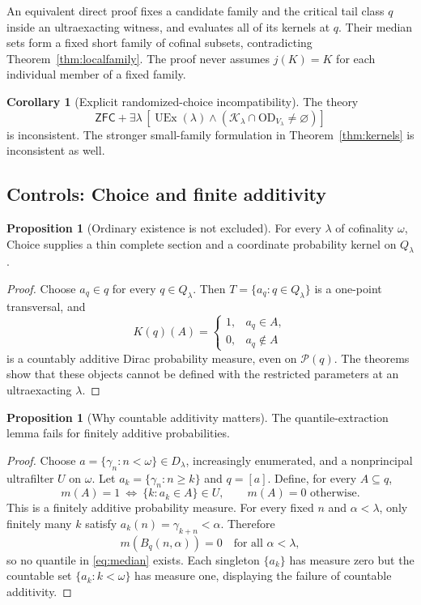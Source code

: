 \documentclass[11pt,letterpaper]{article}
\theoremstyle{definition}
\newtheorem{proposition}[definition]{Proposition}
\newtheorem{corollary}[definition]{Corollary}
\numberwithin{equation}{section}
\newcommand{\ZFC}{\mathsf{ZFC}}
\newcommand{\OD}{\mathrm{OD}}
\newcommand{\UEx}{\operatorname{UEx}}
\newcommand{\Pow}{\mathcal P}
\newcommand{\D}{D_\lambda}
\newcommand{\Q}{Q_\lambda}
\newcommand{\Ker}{\mathcal K_\lambda}
\begin{document}
An equivalent direct proof fixes a candidate family and the critical tail class $q$ inside an ultraexacting witness, and evaluates all of its kernels at $q$. Their median sets form a fixed short family of cofinal subsets, contradicting Theorem~\ref{thm:localfamily}. The proof never assumes $j(K)=K$ for each individual member of a fixed family.

\begin{corollary}[Explicit randomized-choice incompatibility]\label{cor:kernelcons}
The theory
\[
 \ZFC+\exists\lambda\,[\UEx(\lambda)\wedge
          (\Ker\cap\OD_{V_\lambda}\ne\varnothing)]
\]
is inconsistent. The stronger small-family formulation in Theorem~\ref{thm:kernels} is inconsistent as well.
\end{corollary}

\subsection{Controls: Choice and finite additivity}

\begin{proposition}[Ordinary existence is not excluded]\label{prop:dirac}
For every $\lambda$ of cofinality $\omega$, Choice supplies a thin complete section and a coordinate probability kernel on $\Q$.
\end{proposition}
\begin{proof}
Choose $a_q\in q$ for every $q\in\Q$. Then $T=\{a_q:q\in\Q\}$ is a one-point transversal, and
\[
 K(q)(A)=\begin{cases}1,&a_q\in A,\\0,&a_q\notin A\end{cases}
\]
is a countably additive Dirac probability measure, even on $\Pow(q)$. The theorems show that these objects cannot be defined with the restricted parameters at an ultraexacting $\lambda$.
\end{proof}

\begin{proposition}[Why countable additivity matters]\label{prop:finiteadd}
The quantile-extraction lemma fails for finitely additive probabilities.
\end{proposition}
\begin{proof}
Choose $a=\{\gamma_n:n<\omega\}\in\D$, increasingly enumerated, and a nonprincipal ultrafilter $U$ on $\omega$. Let $a_k=\{\gamma_n:n\ge k\}$ and $q=[a]$. Define, for every $A\subseteq q$,
\[
 m(A)=1\ \Longleftrightarrow\ \{k:a_k\in A\}\in U,
 \qquad m(A)=0\text{ otherwise}.
\]
This is a finitely additive probability measure. For every fixed $n$ and $\alpha<\lambda$, only finitely many $k$ satisfy $a_k(n)=\gamma_{k+n}<\alpha$. Therefore
\[
 m(B_q(n,\alpha))=0
 \quad\text{for all }\alpha<\lambda,
\]
so no quantile in \eqref{eq:median} exists. Each singleton $\{a_k\}$ has measure zero but the countable set $\{a_k:k<\omega\}$ has measure one, displaying the failure of countable additivity.
\end{proof}
\end{document}
